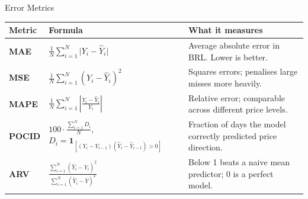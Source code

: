 \begin{frame}{Error Metrics \cite{ferreira2008}}
  \vspace{0.2em}
  \footnotesize
  \renewcommand{\arraystretch}{1.4}
  \setlength{\tabcolsep}{5pt}
  \begin{tabular}{>{\bfseries}p{1.1cm} p{6.2cm} p{4.6cm}}
    \toprule
    \textbf{Metric} & \textbf{Formula} & \textbf{What it measures} \\
    \midrule
    MAE
      & $\displaystyle\frac{1}{N}\sum_{i=1}^{N} \bigl|Y_i - \hat{Y}_i\bigr|$
      & Average absolute error in BRL. Lower is better. \\[3pt]
    MSE
      & $\displaystyle\frac{1}{N}\sum_{i=1}^{N} (Y_i - \hat{Y}_i)^2$
      & Squares errors; penalises large misses more heavily. \\[3pt]
    MAPE
      & $\displaystyle\frac{1}{N}\sum_{i=1}^{N} \left|\frac{Y_i - \hat{Y}_i}{Y_i}\right|$
      & Relative error; comparable across different price levels. \\[3pt]
    POCID
      & $\displaystyle 100 \cdot \frac{\sum_{i=1}^{N} D_i}{N}$, \quad
        $D_i = \mathbf{1}_{\left[(Y_i\!-\!Y_{i-1})(\hat{Y}_i\!-\!\hat{Y}_{i-1}) > 0\right]}$
      & Fraction of days the model correctly predicted price direction. \\[3pt]
    ARV
      & $\displaystyle\frac{\sum_{i=1}^{N}(\hat{Y}_i - Y_i)^2}{\sum_{i=1}^{N}(\hat{Y}_i - \bar{Y})^2}$
      & Below 1 beats a naive mean predictor; 0 is a perfect model. \\
    \bottomrule
  \end{tabular}
\end{frame}

